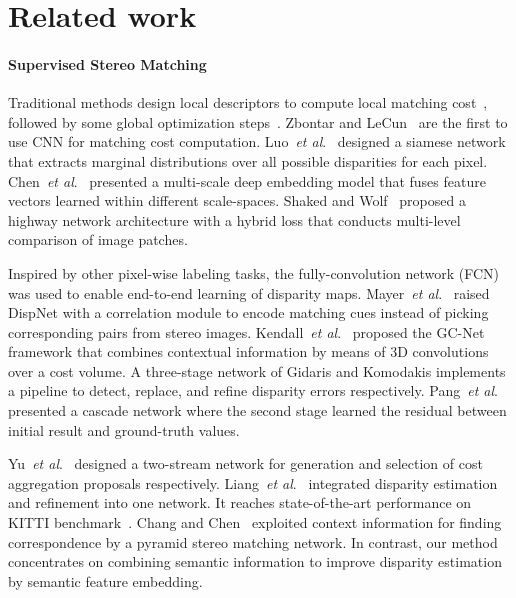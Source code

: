 \documentclass[runningheads]{llncs}
\newcommand{\etal}{\textit{et al}.}
\begin{document}
\section{Related work}

\paragraph{\textbf{Supervised Stereo Matching}}
Traditional methods design local descriptors to compute local matching cost~\cite{geiger2010efficient,heise2015fast}, followed by some global optimization steps~\cite{hirschmuller2008stereo}. Zbontar and LeCun~\cite{zbontar2016stereo} are the first to use CNN for matching cost computation. Luo~\etal~\cite{luo2016efficient} designed a siamese network that extracts marginal distributions over all possible disparities for each pixel. Chen~\etal~\cite{chen2015deep} presented a multi-scale deep embedding model that fuses feature vectors learned within different scale-spaces. Shaked and Wolf~\cite{shaked2016improved} proposed a highway network architecture with a hybrid loss that conducts multi-level comparison of image patches.

Inspired by other pixel-wise labeling tasks, the fully-convolution network (FCN)~\cite{long2015fully} was used to enable end-to-end learning of disparity maps. Mayer~\etal~\cite{mayer2016large} raised {DispNet} with a correlation module to encode matching cues instead of picking corresponding pairs from stereo images. Kendall~\etal~\cite{kendall2017end} proposed the {GC-Net} framework that combines contextual information by means of 3D convolutions over a cost volume. A three-stage network of Gidaris and Komodakis \cite{gidaris2016detect} implements a pipeline to detect, replace, and refine disparity errors respectively. Pang~\etal~\cite{pang2017cascade} presented a cascade network where the second stage learned the residual between initial result and ground-truth values.

Yu~\etal~\cite{yu2018deep} designed a two-stream network for generation and selection of cost aggregation proposals respectively. Liang~\etal~\cite{Liang2018Learning} integrated disparity estimation and refinement into one network. It reaches state-of-the-art performance on KITTI benchmark~\cite{Menze2015CVPR}. Chang and Chen~\cite{chang2018pyramid} exploited context information for finding correspondence by a pyramid stereo matching network. In contrast, our method concentrates on combining semantic information to improve disparity estimation by semantic feature embedding.
\end{document}
